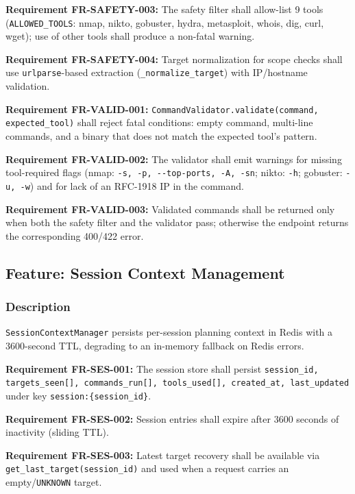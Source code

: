 \documentclass[10pt,journal,onecolumn]{IEEEtran}
\newcommand{\reqid}[1]{\textbf{#1}}
\begin{document}
\reqid{Requirement FR-SAFETY-003:} The safety filter shall allow-list 9 tools (\texttt{ALLOWED\_TOOLS}: nmap, nikto, gobuster, hydra, metasploit, whois, dig, curl, wget); use of other tools shall produce a non-fatal warning.

\reqid{Requirement FR-SAFETY-004:} Target normalization for scope checks shall use \texttt{urlparse}-based extraction (\texttt{\_normalize\_target}) with IP/hostname validation.

\reqid{Requirement FR-VALID-001:} \texttt{CommandValidator.\allowbreak validate(command, expected\_\allowbreak tool)} shall reject fatal conditions: empty command, multi-line commands, and a binary that does not match the expected tool's pattern.

\reqid{Requirement FR-VALID-002:} The validator shall emit warnings for missing tool-required flags (nmap: \texttt{-\allowbreak s, -\allowbreak p, -\allowbreak -\allowbreak top-\allowbreak ports, -\allowbreak A, -\allowbreak sn}; nikto: \texttt{-h}; gobuster: \texttt{-u, -w}) and for lack of an RFC-1918 IP in the command.

\reqid{Requirement FR-VALID-003:} Validated commands shall be returned only when both the safety filter and the validator pass; otherwise the endpoint returns the corresponding 400/422 error.

\subsection{Feature: Session Context Management}

\subsubsection{Description}

\texttt{SessionContextManager} persists per-session planning context in Redis with a 3600-second TTL, degrading to an in-memory fallback on Redis errors.

\reqid{Requirement FR-SES-001:} The session store shall persist \texttt{session\_\allowbreak id, targets\_\allowbreak seen[], commands\_\allowbreak run[], tools\_\allowbreak used[], created\_\allowbreak at, last\_\allowbreak updated} under key \texttt{session:\{session\_id\}}.

\reqid{Requirement FR-SES-002:} Session entries shall expire after 3600 seconds of inactivity (sliding TTL).

\reqid{Requirement FR-SES-003:} Latest target recovery shall be available via \texttt{get\_\allowbreak last\_\allowbreak target(session\_\allowbreak id)} and used when a request carries an empty/\texttt{UNKNOWN} target.
\end{document}
